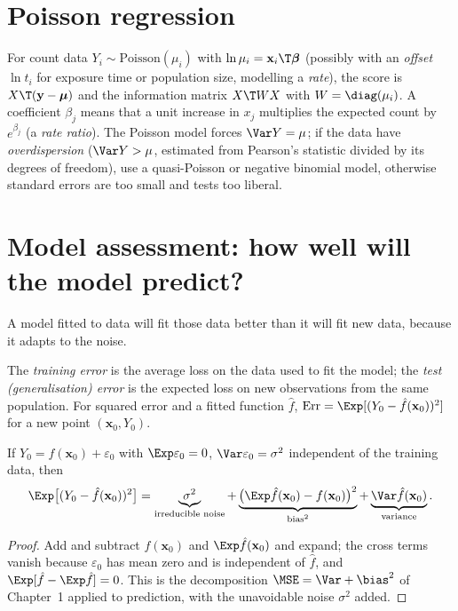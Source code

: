 \section{Poisson regression}

For count data $Y_i\sim\mathrm{Poisson}(\mu_i)$ with $\ln\mu_i=\mathbf{x}_i\T\boldsymbol\beta$ (possibly with an \emph{offset} $\ln t_i$ for exposure time or population size, modelling a \emph{rate}), the score is $X\T(\mathbf{y}-\boldsymbol\mu)$ and the information matrix $X\T WX$ with $W=\diag(\mu_i)$. A coefficient $\beta_j$ means that a unit increase in $x_j$ multiplies the expected count by $e^{\beta_j}$ (a \emph{rate ratio}). The Poisson model forces $\Var Y=\mu$; if the data have \emph{overdispersion} ($\Var Y>\mu$, estimated from Pearson's statistic divided by its degrees of freedom), use a quasi-Poisson or negative binomial model, otherwise standard errors are too small and tests too liberal.

\section{Model assessment: how well will the model predict?}

A model fitted to data will fit those data better than it will fit new data, because it adapts to the noise.

\begin{definition}
The \emph{training error} is the average loss on the data used to fit the model; the \emph{test (generalisation) error} is the expected loss on new observations from the same population. For squared error and a fitted function $\hat{f}$, $\mathrm{Err}=\Exp[(Y_0-\hat{f}(\mathbf{x}_0))^2]$ for a new point $(\mathbf{x}_0,Y_0)$.
\end{definition}

\begin{theorem}\label{thm:biasvar-pred}
If $Y_0=f(\mathbf{x}_0)+\varepsilon_0$ with $\Exp\varepsilon_0=0$, $\Var\varepsilon_0=\sigma^2$ independent of the training data, then
\[ \Exp\big[(Y_0-\hat{f}(\mathbf{x}_0))^2\big]=\underbrace{\sigma^2}_{\text{irreducible noise}}+\underbrace{\big(\Exp\hat{f}(\mathbf{x}_0)-f(\mathbf{x}_0)\big)^2}_{\text{bias}^2}+\underbrace{\Var\hat{f}(\mathbf{x}_0)}_{\text{variance}}. \]
\end{theorem}

\begin{proof}
Add and subtract $f(\mathbf{x}_0)$ and $\Exp\hat{f}(\mathbf{x}_0)$ and expand; the cross terms vanish because $\varepsilon_0$ has mean zero and is independent of $\hat{f}$, and $\Exp[\hat{f}-\Exp\hat{f}]=0$. This is the decomposition $\MSE=\Var+\bias^2$ of Chapter~1 applied to prediction, with the unavoidable noise $\sigma^2$ added.
\end{proof}

